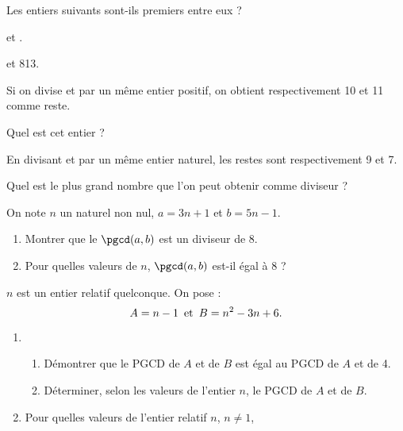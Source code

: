 \documentclass{cornouaille}
\begin{document}
\begin{colonne*exercice}
\begin{exercice}
Les entiers suivants sont-ils premiers entre eux ?
\begin{colenumerate}{2}
\item {} et . 
\item {} et 813.
\end{colenumerate}
\end{exercice}

\begin{exercice}
  Si on divise  et  par un même entier
  positif, on obtient respectivement 10 et 11 comme reste.

  Quel est cet entier ?
\end{exercice}

\begin{exercice}
  En divisant  et  par un même entier
  naturel, les restes sont respectivement 9 et 7. 

  Quel est le plus grand nombre que l’on peut obtenir comme diviseur ?
\end{exercice}

\begin{exercice}
On note $n$ un naturel non nul, $a=3n+1$ et $b=5n-1$.
\begin{enumerate}
\item Montrer que le $\pgcd(a,b)$ est un diviseur de 8.
\item Pour quelles valeurs de $n$, $\pgcd(a,b)$ est-il égal à 8 ?
\end{enumerate}
\end{exercice}

\begin{exercice}
$n$ est un entier relatif quelconque. On pose :\vspace{-10pt}
$$A=n-1\enskip \text{et}\enskip B=n^2-3n+6.\vspace{-5pt}$$
\begin{enumerate}
\item\begin{enumerate}
\item Démontrer que le PGCD de $A$ et de $B$ est égal au PGCD de $A$ et de 4.
\item Déterminer, selon les valeurs de l’entier $n$, le PGCD de $A$ et de $B$.
\end{enumerate}
\item Pour quelles valeurs de l’entier relatif $n$, $n\neq1$,\vspace{5pt}


\end{enumerate}
\end{exercice}
\end{colonne*exercice}
\end{document}
